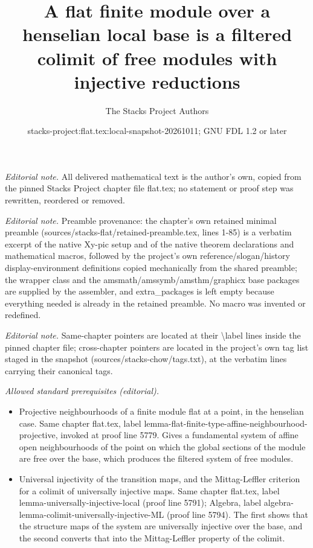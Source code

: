 \documentclass[10pt,a4paper]{amsart}
\title{A flat finite module over a henselian local base is a filtered colimit of free modules with injective reductions}
\author{The Stacks Project Authors}
\date{stacks-project:flat.tex:local-snapshot-20261011; GNU FDL 1.2 or later}
\theoremstyle{plain}
\theoremstyle{definition}
\theoremstyle{remark}
\numberwithin{equation}{subsection}
\begin{document}
\maketitle
\noindent\textit{Editorial note.} All delivered mathematical text is the author's own, copied from the pinned Stacks Project chapter file flat.tex; no statement or proof step was rewritten, reordered or removed.\par\medskip
\noindent\textit{Editorial note.} Preamble provenance: the chapter's own retained minimal preamble (sources/stacks-flat/retained-preamble.tex, lines 1-85) is a verbatim excerpt of the native Xy-pic setup and of the native theorem declarations and mathematical macros, followed by the project's own reference/slogan/history display-environment definitions copied mechanically from the shared preamble; the wrapper class and the amsmath/amssymb/amsthm/graphicx base packages are supplied by the assembler, and extra\_packages is left empty because everything needed is already in the retained preamble. No macro was invented or redefined.\par\medskip
\noindent\textit{Editorial note.} Same-chapter pointers are located at their \textbackslash{}label lines inside the pinned chapter file; cross-chapter pointers are located in the project's own tag list staged in the snapshot (sources/stacks-chow/tags.txt), at the verbatim lines carrying their canonical tags.\par\medskip
\noindent\textit{Allowed standard prerequisites (editorial).}\begin{itemize}
\item Projective neighbourhoods of a finite module flat at a point, in the henselian case. Same chapter flat.tex, label lemma-flat-finite-type-affine-neighbourhood-projective, invoked at proof line 5779. Gives a fundamental system of affine open neighbourhoods of the point on which the global sections of the module are free over the base, which produces the filtered system of free modules.
\item Universal injectivity of the transition maps, and the Mittag-Leffler criterion for a colimit of universally injective maps. Same chapter flat.tex, label lemma-universally-injective-local (proof line 5791); Algebra, label algebra-lemma-colimit-universally-injective-ML (proof line 5794). The first shows that the structure maps of the system are universally injective over the base, and the second converts that into the Mittag-Leffler property of the colimit.
\end{itemize}\medskip
\end{document}
